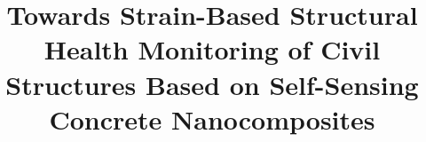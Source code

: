 \documentclass[twocolumn]{bmcart}%
\begin{document}
\begin{frontmatter}

\begin{fmbox}


\title{Towards Strain-Based Structural Health Monitoring of Civil Structures Based on Self-Sensing Concrete Nanocomposites}


\author[
   addressref={aff1},                   %
   corref={aff1},                       %
   email={diego.castanedas@upb.edu.co}   %
]{ }
\author[
   addressref={aff1},
   email={joham.alvarez@upb.edu.co}
]{ }
\author[
   addressref={aff2},
   email={hader.martinez@upb.edu.co}
]{ }
\author[
   addressref={aff1},
   email={julian.sierra@upb.edu.co}
]{ }


\address[id=aff1]{%
  , %
  ,                              %
}
\address[id=aff2]{%
  ,
  ,                              %
}


\end{fmbox}
\end{frontmatter}
\end{document}
